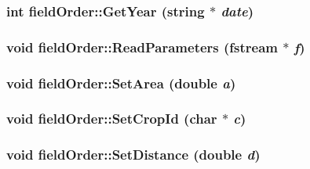 \hypertarget{classfield_order_af66dab2622b81f860f238509146f4361}{
\subsubsection[{GetYear}]{\setlength{\rightskip}{0pt plus 5cm}int fieldOrder::GetYear (string $\ast$ {\em date})}}
\label{classfield_order_af66dab2622b81f860f238509146f4361}
\hypertarget{classfield_order_a00ed3e67467f00acb832799273b0f04a}{
\subsubsection[{ReadParameters}]{\setlength{\rightskip}{0pt plus 5cm}void fieldOrder::ReadParameters (fstream $\ast$ {\em f})}}
\label{classfield_order_a00ed3e67467f00acb832799273b0f04a}
\hypertarget{classfield_order_ac689fa9a09d2e97c63dd7d0d04039c73}{
\subsubsection[{SetArea}]{\setlength{\rightskip}{0pt plus 5cm}void fieldOrder::SetArea (double {\em a})}}
\label{classfield_order_ac689fa9a09d2e97c63dd7d0d04039c73}
\hypertarget{classfield_order_a9450351fd1d3017621193440f2899f10}{
\subsubsection[{SetCropId}]{\setlength{\rightskip}{0pt plus 5cm}void fieldOrder::SetCropId (char $\ast$ {\em c})}}
\label{classfield_order_a9450351fd1d3017621193440f2899f10}
\hypertarget{classfield_order_ae9dfee3dc8f17fbaa56c430927be070d}{
\subsubsection[{SetDistance}]{\setlength{\rightskip}{0pt plus 5cm}void fieldOrder::SetDistance (double {\em d})}}
